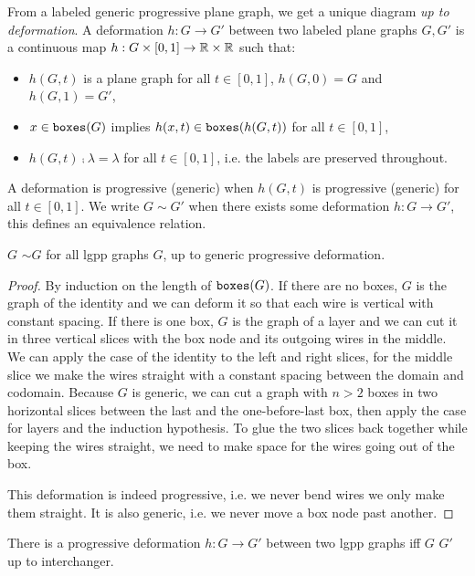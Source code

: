From a labeled generic progressive plane graph, we get a unique diagram \emph{up to deformation}.
A deformation $h : G \to G'$ between two labeled plane graphs $G, G'$ is a continuous map $h : G \times [0, 1] \to \mathbb{R} \times \mathbb{R}$ such that:
\begin{itemize}
\item $h(G, t)$ is a plane graph for all $t \in [0, 1]$, $h(G, 0) = G$ and $h(G, 1) = G'$,
\item $x \in \mathtt{boxes}(G)$ implies $h(x, t) \in \mathtt{boxes}(h(G, t))$ for all $t \in [0, 1]$,
\item $h(G, t) \fcmp \lambda = \lambda$ for all $t \in [0, 1]$, i.e. the labels are preserved throughout.
\end{itemize}
A deformation is progressive (generic) when $h(G, t)$ is progressive (generic) for all $t \in [0, 1]$.
We write $G \sim G'$ when there exists some deformation $h : G \to G'$, this defines an equivalence relation.

\begin{proposition}\label{proposition:g2d then d2g}
 $G$ \py{))} $\sim G$ for all lgpp graphs $G$, up to generic progressive deformation.
\end{proposition}

\begin{proof}
By induction on the length of $\mathtt{boxes}(G)$.
If there are no boxes, $G$ is the graph of the identity and we can deform it so that each wire is vertical with constant spacing.
If there is one box, $G$ is the graph of a layer and we can cut it in three vertical slices with the box node and its outgoing wires in the middle.
We can apply the case of the identity to the left and right slices, for the middle slice we make the wires straight with a constant spacing between the domain and codomain.
Because $G$ is generic, we can cut a graph with $n > 2$ boxes in two horizontal slices between the last and the one-before-last box, then apply the case for layers and the induction hypothesis.
To glue the two slices back together while keeping the wires straight, we need to make space for the wires going out of the box.

This deformation is indeed progressive, i.e. we never bend wires we only make them straight.
It is also generic, i.e. we never move a box node past another.
\end{proof}

\begin{proposition}\label{proposition:d2g then g2d}
There is a progressive deformation $h : G \to G'$ between two lgpp graphs iff  $G$  $G'$ \py{)} up to interchanger.
\end{proposition}

